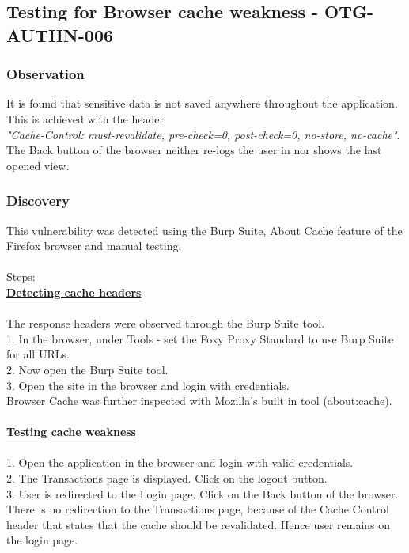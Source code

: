 \subsection{Testing for Browser cache weakness - OTG-AUTHN-006}

\subsubsection{Observation}
It is found that sensitive data is not saved anywhere throughout the application. This is achieved with the header \\
\textit{"Cache-Control: must-revalidate, pre-check=0, post-check=0, no-store, no-cache"}. \\
The Back button of the browser neither re-logs the user in nor shows the last opened view.

\subsubsection{Discovery}
This vulnerability was detected using the Burp Suite, About Cache feature of the Firefox browser and manual testing. \\
\\Steps:\\
\underline{\textbf{Detecting cache headers}}\\
\\The response headers were observed through the Burp Suite tool.\\
1. In the browser, under Tools - set the Foxy Proxy Standard to use Burp Suite for all URLs.\\
2. Now open the Burp Suite tool.\\
3. Open the site in the browser and login with credentials.\\
Browser Cache was further inspected with Mozilla's built in tool (about:cache). \\
\\\underline{\textbf{Testing cache weakness}} \\
\\1. Open the application in the browser and login with valid credentials.\\
2. The Transactions page is displayed. Click on the logout button.\\
3. User is redirected to the Login page. Click on the Back button of the browser.\\
There is no redirection to the Transactions page, because of the Cache Control header that states that the cache should be revalidated. Hence user remains on the login page.
